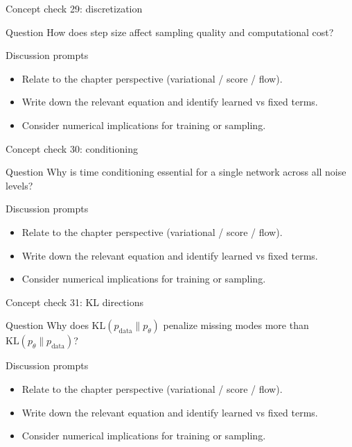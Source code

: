 \documentclass[aspectratio=169]{beamer}
\begin{document}
\begin{frame}{Concept check 29: discretization}
\begin{block}{Question}
How does step size affect sampling quality and computational cost?
\end{block}
\begin{block}{Discussion prompts}
\begin{itemize}
\item Relate to the chapter perspective (variational / score / flow).
\item Write down the relevant equation and identify learned vs fixed terms.
\item Consider numerical implications for training or sampling.
\end{itemize}
\end{block}
\end{frame}

\begin{frame}{Concept check 30: conditioning}
\begin{block}{Question}
Why is time conditioning essential for a single network across all noise levels?
\end{block}
\begin{block}{Discussion prompts}
\begin{itemize}
\item Relate to the chapter perspective (variational / score / flow).
\item Write down the relevant equation and identify learned vs fixed terms.
\item Consider numerical implications for training or sampling.
\end{itemize}
\end{block}
\end{frame}

\begin{frame}{Concept check 31: KL directions}
\begin{block}{Question}
Why does \(\mathrm{KL}(p_{\text{data}}\|p_\theta)\) penalize missing modes more than \(\mathrm{KL}(p_\theta\|p_{\text{data}})\)?
\end{block}
\begin{block}{Discussion prompts}
\begin{itemize}
\item Relate to the chapter perspective (variational / score / flow).
\item Write down the relevant equation and identify learned vs fixed terms.
\item Consider numerical implications for training or sampling.
\end{itemize}
\end{block}
\end{frame}
\end{document}
